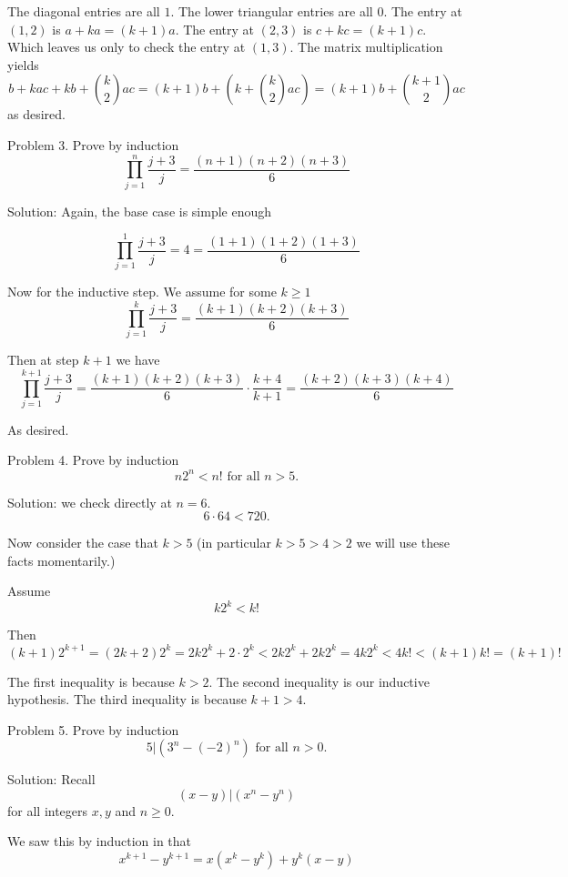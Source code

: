 \documentclass[16 pt]{amsart}
\theoremstyle{definition}
\theoremstyle{remark}
\numberwithin{equation}{subsection}
\begin{document}
The diagonal entries are all $1$.  The lower triangular entries are all $0$.
The entry at $(1,2)$ is $a + ka = (k+1)a$.  
The entry at $(2,3)$ is $c + kc = (k+1)c$.  Which leaves us only to check the entry at $(1,3)$.
The matrix multiplication yields
\[
b + kac + kb + {k\choose 2}ac = (k+1)b + (k+{k\choose 2}ac) = (k+1)b + {k+1 \choose 2}ac
\]
as desired.

\newpage
Problem 3.
Prove by induction
\[
\prod_{j=1}^{n} \frac{j+3}{j}= \frac{(n+1)(n+2)(n+3)}{6} 
\]

\vspace{.5in}

Solution: Again, the base case is simple enough

\[
\prod_{j=1}^{1} \frac{j+3}{j}= 4 = \frac{(1+1)(1+2)(1+3)}{6} 
\]

Now for the inductive step.  We assume for some $k\ge 1$
\[
\prod_{j=1}^{k} \frac{j+3}{j}= \frac{(k+1)(k+2)(k+3)}{6} 
\]

Then at step $k+1$ we have
\[
\prod_{j=1}^{k+1} \frac{j+3}{j}= \frac{(k+1)(k+2)(k+3)}{6} \cdot \frac{k+4}{k+1} = \frac{(k+2)(k+3)(k+4)}{6} 
\]

As desired.


\newpage

Problem 4.
Prove by induction
\[
n2^n < n! \text{ for all } n>5.
\]


\vspace{.5in}

Solution: we check directly at $n=6$.
\[
6\cdot 64 < 720.
\]

Now consider the case that $k>5$ (in particular $k>5>4>2$ we will use these facts momentarily.)

Assume 
\[
k 2^k < k!
\]

Then 
\[
(k+1) 2^{k+1} = (2k+2)2^k = 2k2^k + 2\cdot 2^k < 2k 2^k + 2k 2^k = 4k2^k < 4k! < (k+1)k! = (k+1)!
\]

The first inequality is because $k>2$. The second inequality is our inductive hypothesis.  The third inequality is because $k+1 > 4$. 



\newpage 
Problem 5.
Prove by induction
\[
5 | (3^n - (-2)^n) \text{ for all } n>0.
\]

\vspace{.5in}

Solution: Recall
\[
(x-y) | (x^n - y^n)
\]
for all integers $x,y$ and $n\ge 0$.

We saw this by induction in that
\[
x^{k+1} - y^{k+1} = x(x^k-y^k) + y^k(x-y)
\]
\end{document}
